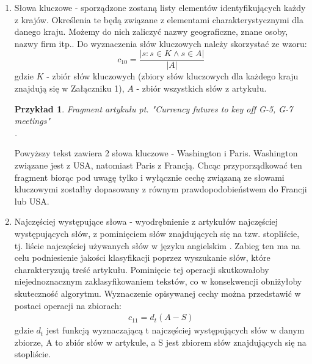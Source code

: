 \documentclass{classrep}
\newtheorem{exmp}{Przykład}[section]
\begin{document}
\begin{enumerate}
    \item Słowa kluczowe - sporządzone zostaną listy elementów identyfikujących każdy z krajów. Określenia te będą związane z elementami charakterystycznymi dla danego kraju. Możemy do nich zaliczyć nazwy geograficzne, znane osoby, nazwy firm itp.. Do wyznaczenia słów kluczowych należy skorzystać ze wzoru: 
    \begin{equation}
        c_{10} = \frac{|{s: s \in K \land s \in A}|}{|A|}
    \end{equation}
    gdzie $K$ - zbiór słów kluczowych (zbiory słów kluczowych dla każdego kraju znajdują się w Załączniku 1), $A$ - zbiór wszystkich słów z artykułu. \\
    \begin{exmp}Fragment artykułu pt. "Currency futures to key off G-5, G-7 meetings" \cite{reuters} \\
    . \\
    \end{exmp}
    Powyższy tekst zawiera 2 słowa kluczowe - Washington i Paris. Washington związane jest z USA, natomiast Paris z Francją. Chcąc przyporządkować ten fragment biorąc pod uwagę tylko i wyłącznie cechę związaną ze słowami kluczowymi zostałby dopasowany z równym prawdopodobieństwem do Francji lub USA. \\
    \item Najczęściej występujące słowa - wyodrębnienie z artykułów najczęściej występujących słów, z pominięciem słów znajdujących się na tzw. stopliście, tj. liście najczęściej używanych słów w języku angielskim \cite{coca_words}. Zabieg ten ma na celu podniesienie jakości klasyfikacji poprzez wyszukanie słów, które charakteryzują treść artykułu. Pominięcie tej operacji skutkowałoby niejednoznacznym zaklasyfikowaniem tekstów, co w konsekwencji obniżyłoby skuteczność algorytmu. 
	Wyznaczenie opisywanej cechy można przedstawić w postaci operacji na zbiorach:
	\begin{gather}
	c_{11}= d_{t}(A - S)
	\end{gather} 
	\indent gdzie $d_{t}$ jest funkcją wyznaczającą t najczęściej występujących słów w danym zbiorze, A to zbiór słów w artykule, 
	a S jest zbiorem słów znajdujących się na stopliście. \\

\end{enumerate}
\end{document}
